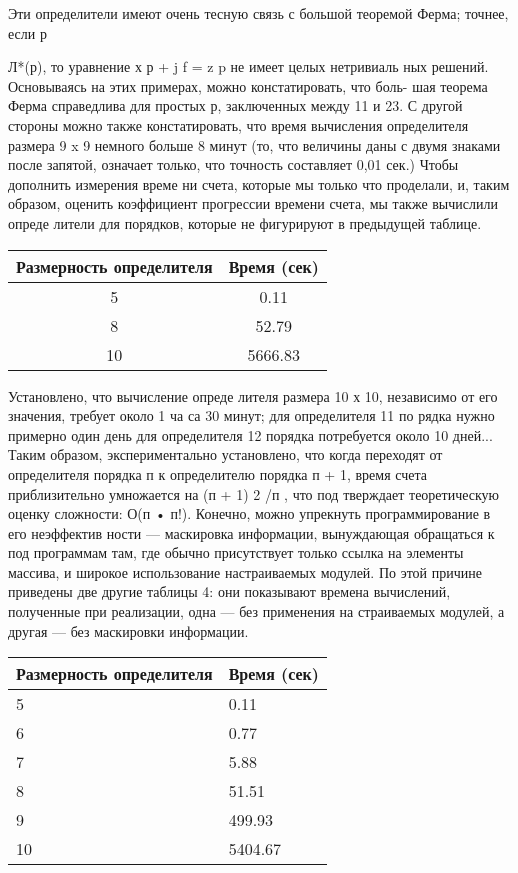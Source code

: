 \documentclass{../../template/mai_book}
\begin{document}
Эти определители
имеют очень тесную связь с
большой теоремой Фер­ма;
точнее, если р { Л*(р),
то уравнение х р + j f = z p
не имеет целых нетривиаль­
ных решений. Основываясь
на этих примерах, можно
констатировать, что боль-
шая теорема Ферма справедлива для простых р, заключенных между
11 и 23. С другой стороны можно также констатировать, что время
вычисления определителя размера 9 x 9 немного больше 8 минут (то,
что величины даны с двумя знаками после запятой, означает только,
что точность составляет 0,01 сек.) Чтобы дополнить измерения време­
ни счета, которые мы только что проделали, и, таким образом, оценить
коэффициент прогрессии времени счета, мы также вычислили опреде­
лители для порядков, которые не фигурируют в предыдущей таблице.

\newpage
\begin{wraptable}{l}{8cm}
\begin{tabular}{|c|c|}
\hline
Размерность определителя & Время (сек) \\ \hline
5 & 0.11 \\
8 & 52.79 \\
10 & 5666.83 \\ \hline
\end{tabular}
\end{wraptable}
Установлено, что вычисление опреде­
лителя размера 10 х 10, независимо
от его значения, требует около 1 ча­
са 30 минут; для определителя 11 по­
рядка нужно примерно один день для
определителя 12 порядка потребуется
около 10 дней... Таким образом, экспериментально установлено, что
когда переходят от определителя порядка п к определителю порядка
п + 1, время счета приблизительно умножается на (п + 1) 2 /п , что под­
тверждает теоретическую оценку сложности: О(п • п!).
Конечно, можно упрекнуть программирование в его неэффектив­
ности — маскировка информации, вынуждающая обращаться к под­
программам там, где обычно присутствует только ссылка на элементы
массива, и широкое использование настраиваемых модулей. По этой
причине приведены две другие таблицы 4: они показывают времена
вычислений, полученные при реализации, одна — без применения на­
страиваемых модулей, а другая — без маскировки информации.

\begin{multicols}{2}
\begin{tabular}{|p{2.75cm}|p{2.75cm}|}
\hline
Размерность определителя & Время  (сек) \\ \hline
5 & 0.11 \\
6 & 0.77 \\
7 & 5.88 \\
8 & 51.51 \\
9 & 499.93 \\
10 & 5404.67 \\ \hline
\end{tabular}


\end{multicols}}
\end{document}
